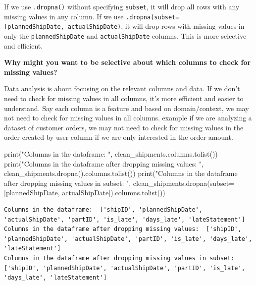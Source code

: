 \documentclass[
]{article}
\newenvironment{Shaded}{\begin{snugshade}}{\end{snugshade}}
\newcommand{\BuiltInTok}[1]{\textcolor[rgb]{0.00,0.23,0.31}{#1}}
\newcommand{\NormalTok}[1]{\textcolor[rgb]{0.00,0.23,0.31}{#1}}
\newcommand{\OperatorTok}[1]{\textcolor[rgb]{0.37,0.37,0.37}{#1}}
\newcommand{\StringTok}[1]{\textcolor[rgb]{0.13,0.47,0.30}{#1}}
\begin{document}
If we use \texttt{.dropna()} without specifying \texttt{subset}, it will
drop all rows with any missing values in any column. If we use
\texttt{.dropna(subset={[}\textquotesingle{}plannedShipDate\textquotesingle{},\ \textquotesingle{}actualShipDate\textquotesingle{}{]})},
it will drop rows with missing values in only the
\texttt{plannedShipDate} and \texttt{actualShipDate} columns. This is
more selective and efficient.

\textbf{Why might you want to be selective about which columns to check
for missing values?}

Data analysis is about focusing on the relevant columns and data. If we
don't need to check for missing values in all columns, it's more
efficient and easier to understand. Say each column is a feature and
based on domain/context, we may not need to check for missing values in
all columns. example if we are analyzing a dataset of customer orders,
we may not need to check for missing values in the order created-by user
column if we are only interested in the order amount.

\label{handling-missing-data}
\begin{Shaded}
\begin{Highlighting}[]
\BuiltInTok{print}\NormalTok{(}\StringTok{"Columns in the dataframe: "}\NormalTok{, clean\_shipments.columns.tolist())}
\BuiltInTok{print}\NormalTok{(}\StringTok{"Columns in the dataframe after dropping missing values: "}\NormalTok{, clean\_shipments.dropna().columns.tolist())}
\BuiltInTok{print}\NormalTok{(}\StringTok{"Columns in the dataframe after dropping missing values in subset: "}\NormalTok{, clean\_shipments.dropna(subset}\OperatorTok{=}\NormalTok{[}\StringTok{\textquotesingle{}plannedShipDate\textquotesingle{}}\NormalTok{, }\StringTok{\textquotesingle{}actualShipDate\textquotesingle{}}\NormalTok{]).columns.tolist())}
\end{Highlighting}
\end{Shaded}

\begin{verbatim}
Columns in the dataframe:  ['shipID', 'plannedShipDate', 'actualShipDate', 'partID', 'is_late', 'days_late', 'lateStatement']
Columns in the dataframe after dropping missing values:  ['shipID', 'plannedShipDate', 'actualShipDate', 'partID', 'is_late', 'days_late', 'lateStatement']
Columns in the dataframe after dropping missing values in subset:  ['shipID', 'plannedShipDate', 'actualShipDate', 'partID', 'is_late', 'days_late', 'lateStatement']
\end{verbatim}
\end{document}
